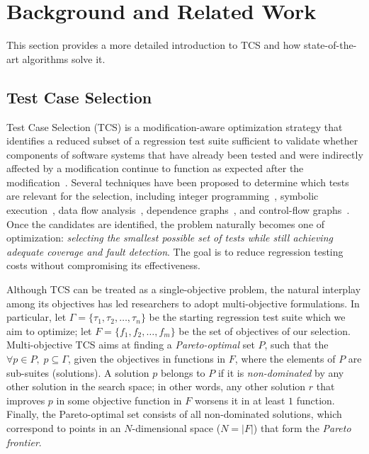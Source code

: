 \section{Background and Related Work}
\label{sec:2}
This section provides a more detailed introduction to TCS and how state-of-the-art algorithms solve it.

\subsection{Test Case Selection}
\label{sec2.1:tcs}
Test Case Selection (TCS) is a modification-aware optimization strategy that identifies a reduced subset of a regression test suite sufficient to validate whether components of software systems that have already been tested and were indirectly affected by a modification continue to function as expected after the modification~\citep {rothermel1996analyzing}. Several techniques have been proposed to determine which tests are relevant for the selection, including integer programming~\citep{fischer1977test}, symbolic execution~\citep{yau1987method}, data flow analysis~\citep{rothermel1993safe}, dependence graphs~\citep{bates1993incremental}, and control-flow graphs~\citep{rothermel1996analyzing}. Once the candidates are identified, the problem naturally becomes one of optimization: \textit{selecting the smallest possible set of tests while still achieving adequate coverage and fault detection}. The goal is to reduce regression testing costs without compromising its effectiveness.

Although TCS can be treated as a single-objective problem, the natural interplay among its objectives has led researchers to adopt multi-objective formulations. In particular, let $\Gamma = \{\tau_1,\tau_2,\dots,\tau_n\}$ be the starting regression test suite which we aim to optimize; let $F = \{f_1,f_2,\dots,f_m\}$ be the set of objectives of our selection. Multi-objective TCS aims at finding a \textit{Pareto-optimal} set $P$, such that the $\forall p \in P,\; p \subseteq \Gamma$, given the objectives in functions in $F$, where the elements of $P$ are sub-suites (solutions). A solution $p$ belongs to $P$ if it is \textit{non-dominated} by any other solution in the search space; in other words, any other solution $r$ that improves $p$ in some objective function in $F$ worsens it in at least $1$ function. Finally, the Pareto-optimal set consists of all non-dominated solutions, which correspond to points in an $N$-dimensional space ($N=|F|$) that form the \textit{Pareto frontier}.

